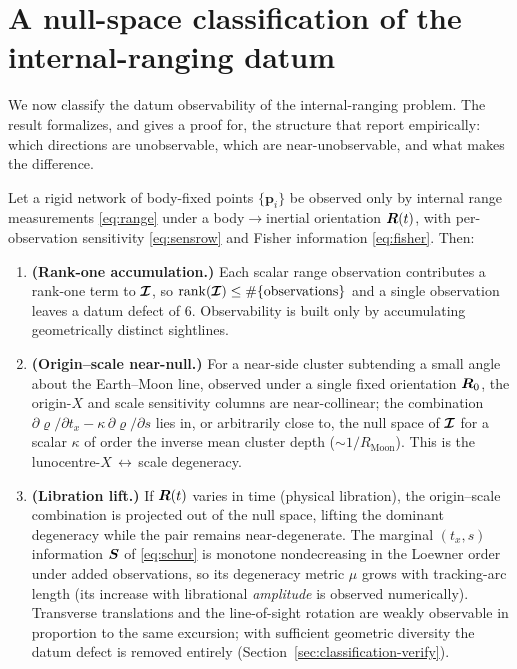 \section{A null-space classification of the internal-ranging datum}
\label{sec:classification}

We now classify the datum observability of the internal-ranging problem. The
result formalizes, and gives a proof for, the structure that
\citet{sosnica2025ilrf} report empirically: which directions are unobservable,
which are near-unobservable, and what makes the difference.

\begin{theorem}
\label{thm:classification}
Let a rigid network of body-fixed points $\{\bm{p}_i\}$ be observed only by
internal range measurements \eqref{eq:range} under a body$\rightarrow$inertial
orientation $\bm{R}(t)$, with per-observation sensitivity \eqref{eq:sensrow} and
Fisher information \eqref{eq:fisher}. Then:
\begin{enumerate}
  \item[\textnormal{(i)}] \textbf{(Rank-one accumulation.)} Each scalar range
  observation contributes a rank-one term to $\bm{\mathcal{I}}$, so
  $\operatorname{rank}(\bm{\mathcal{I}})\le\#\{\text{observations}\}$ and a single
  observation leaves a datum defect of $6$. Observability is built only by
  accumulating geometrically distinct sightlines.
  \item[\textnormal{(ii)}] \textbf{(Origin--scale near-null.)} For a near-side
  cluster subtending a small angle about the Earth--Moon line, observed under a
  single fixed orientation $\bm{R}_0$, the origin-$X$ and scale sensitivity
  columns are near-collinear; the combination
  $\partial\varrho/\partial t_x - \kappa\,\partial\varrho/\partial s$ lies in, or
  arbitrarily close to, the null space of $\bm{\mathcal{I}}$ for a scalar $\kappa$ of order
  the inverse mean cluster depth ($\sim\!1/R_{\mathrm{Moon}}$). This is the
  lunocentre-$X$\,$\leftrightarrow$\,scale degeneracy.
  \item[\textnormal{(iii)}] \textbf{(Libration lift.)} If $\bm{R}(t)$ varies in
  time (physical libration), the origin--scale combination is projected out of the
  null space, lifting the dominant degeneracy while the pair remains
  near-degenerate. The marginal $(t_x,s)$ information $\bm{S}$ of
  \eqref{eq:schur} is monotone nondecreasing in the Loewner order under added
  observations, so its degeneracy metric $\mu$ grows with tracking-arc length (its
  increase with librational \emph{amplitude} is observed numerically). Transverse
  translations and the line-of-sight rotation are weakly observable in proportion
  to the same excursion; with sufficient geometric diversity the datum defect is
  removed entirely (Section~\ref{sec:classification-verify}).
\end{enumerate}
\end{theorem}

